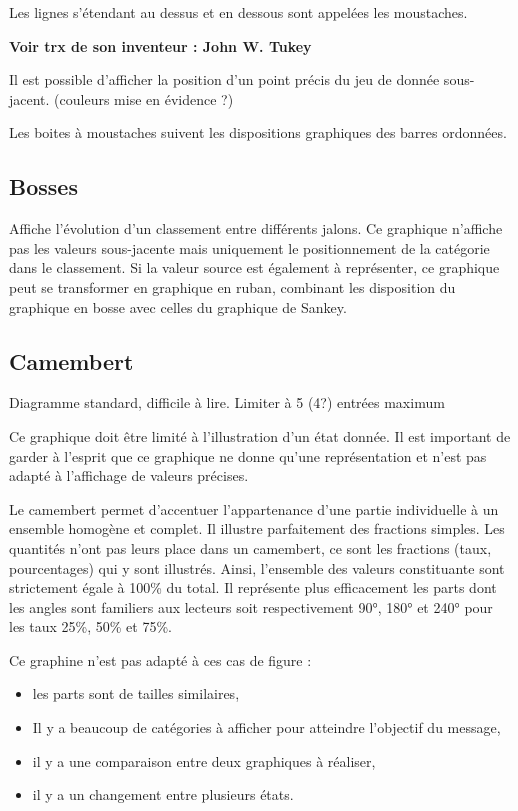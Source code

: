 \documentclass[a4paper,12pt]{article}
\begin{document}
\begin{multicols}{2}
Les lignes s'étendant au dessus et en dessous sont appelées les moustaches. \autocite{wilkeVisualizingManyDistributions2019}

\textbf{Voir trx de son inventeur : John W. Tukey}

Il est possible d'afficher la position d'un point précis du jeu de donnée sous-jacent. (couleurs mise en évidence ?)

Les boites à moustaches suivent les dispositions graphiques des barres ordonnées. \autocite{stephenfewComponentlevelGraphDesign2012}
\subsection*{Bosses}
\label{sec:org6159ae0}
Affiche l'évolution d'un classement entre différents jalons. \autocite{mikeyiHowChooseRight2020,alansmithLexiqueVisuel}  Ce graphique n'affiche pas les valeurs sous-jacente mais uniquement le positionnement de la catégorie dans le classement. \autocite{jonathanschwabishTime2021} Si la valeur source est également à représenter, ce graphique peut se transformer en graphique en ruban, combinant les disposition du graphique en bosse avec celles du graphique de Sankey. \autocite{jonathanschwabishTime2021}
\subsection*{Camembert}
\label{sec:orgd10b1ed}
Diagramme standard, difficile à lire. \autocite{alansmithLexiqueVisuel}
Limiter à 5 (4?) entrées maximum \autocite{mikeyiHowChooseRight2020}

Ce graphique doit être limité à l'illustration d'un état donnée. Il est important de garder à l'esprit que ce graphique ne donne qu'une représentation et n'est pas adapté à l'affichage de valeurs précises. \autocite{jonathanschwabishParttowhole2021}

Le camembert permet d'accentuer l'appartenance d'une partie individuelle à un ensemble homogène et complet. Il illustre parfaitement des fractions simples.\autocite{wilkeDirectoryVisualizations2019} Les quantités n'ont pas leurs place dans un camembert, ce sont les fractions (taux, pourcentages) qui y sont illustrés. Ainsi, l'ensemble des valeurs constituante sont strictement égale à 100\% du total.\autocite{wilkeVisualizingAmounts2019} Il représente plus efficacement les parts dont les angles sont familiers aux lecteurs soit respectivement 90°, 180° et 240° pour les taux 25\%, 50\% et 75\%.

Ce graphine n'est pas adapté à ces cas de figure :
\begin{itemize}
\item les parts sont de tailles similaires,\autocite{sosulskiGraphics2019}
\item Il y a beaucoup de catégories à afficher pour atteindre l'objectif du message,
\item il y a une comparaison entre deux graphiques à réaliser,\autocite{jonathanschwabishParttowhole2021}
\item il y a un changement entre plusieurs états.\autocite{wilkeDirectoryVisualizations2019}
\end{itemize}


\end{multicols}
\end{document}
